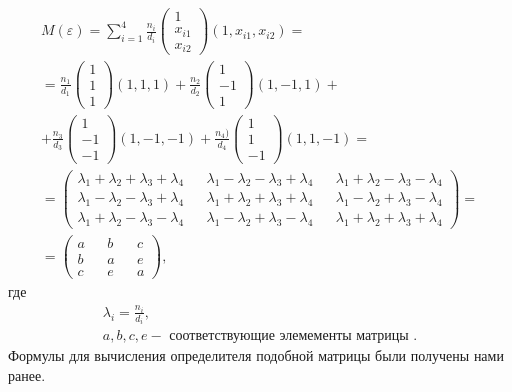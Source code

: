 	\begin{multline*} 
		M(\varepsilon) = \sum_{i = 1}^{4} \frac{n_i} {d_i} 
		\begin{pmatrix}1 \\ x_{i1} \\ x_{i2} \end{pmatrix}
		(1, x_{i1}, x_{i2}) = \\
		= \frac {n_1} {d_1} \begin{pmatrix}1 \\ 1 \\ 1\end{pmatrix} (1, 1, 1) + 
		\frac {n_2} {d_2} \begin{pmatrix}1 \\ -1 \\ 1\end{pmatrix} (1, -1, 1) + \\
		+ \frac {n_3} {d_3} \begin{pmatrix}1 \\ -1 \\ -1\end{pmatrix} (1, -1, -1) +
		\frac {n_4)} {d_4} \begin{pmatrix} 1 \\ 1 \\ -1\end{pmatrix} (1, 1, -1) = \\
		= \begin{pmatrix}
			\lambda_1 + \lambda_2 + \lambda_3 + \lambda_4 &&
			\lambda_1 - \lambda_2 - \lambda_3 + \lambda_4 &&
			\lambda_1 + \lambda_2 - \lambda_3 - \lambda_4
			\\
			\lambda_1 - \lambda_2 - \lambda_3 + \lambda_4 &&
			\lambda_1 + \lambda_2 + \lambda_3 + \lambda_4 &&
			\lambda_1 - \lambda_2 + \lambda_3 - \lambda_4
			\\
			\lambda_1 + \lambda_2 - \lambda_3 - \lambda_4 &&
			\lambda_1 - \lambda_2 + \lambda_3 - \lambda_4 &&
			\lambda_1 + \lambda_2 + \lambda_3 + \lambda_4
		\end{pmatrix} = \\
		= \begin{pmatrix}
			a && b && c \\
			b && a && e \\
			c && e && a
		\end{pmatrix},
	 \end{multline*}
	 где
	\begin{gather*}
		\lambda_i = \frac {n_i} {d_i}, \\
		a, b, c, e - \text{ соответствующие элемементы матрицы }.
	\end{gather*}
	 Формулы для вычисления определителя подобной матрицы были получены нами ранее.
	 

